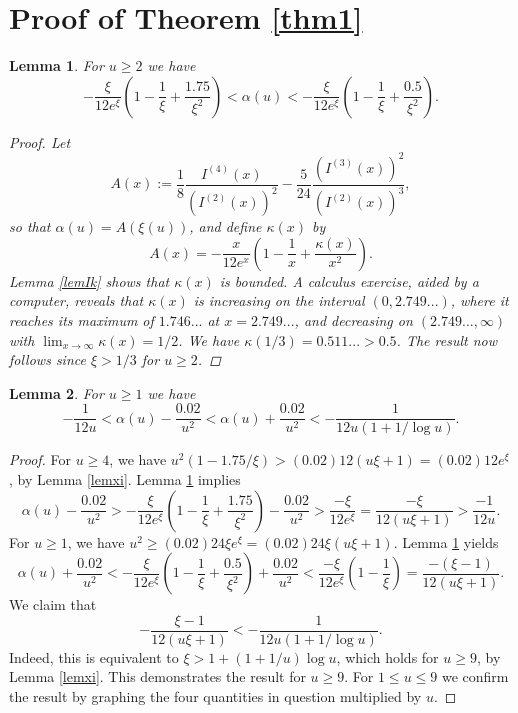 \documentclass[11pt]{amsart}
\newtheorem{lemma}{Lemma}
\begin{document}
\section{Proof of Theorem \ref{thm1}}



\begin{lemma}\label{lemAx}
For $u\ge 2$ we have 
$$
 -\frac{\xi}{12 e^\xi}\left(1-\frac{1}{\xi}+\frac{1.75}{\xi^2}\right)< \alpha(u)< -\frac{\xi}{12 e^\xi}\left(1-\frac{1}{\xi}+\frac{0.5}{\xi^2}\right) .
$$
\begin{proof}
Let
$$
A(x):=\frac{1}{8} \frac{I^{(4)}(x)}{(I^{(2)}(x))^2} - \frac{5}{24} \frac{(I^{(3)}(x))^2}{(I^{(2)}(x))^3} ,
$$
so that $\alpha(u)=A(\xi(u))$, and
define $\kappa(x)$ by 
$$
A(x) = -\frac{x}{12 e^x}\left(1-\frac{1}{x}+\frac{\kappa(x)}{x^2}\right).
$$
Lemma \ref{lemIk} shows that $\kappa(x)$ is bounded.
A calculus exercise, aided by a computer, reveals that 
$\kappa(x)$ is increasing on the interval $(0, 2.749...)$, where it reaches its maximum of $1.746...$ at $x=2.749...$, and decreasing 
on $(2.749..., \infty)$ with $\lim_{x\to \infty} \kappa(x) = 1/2$. We have $\kappa(1/3)=0.511...>0.5$. 
The result now follows since $\xi >1/3$ for $u\ge 2$. 
\end{proof}
\end{lemma}

\begin{lemma}\label{lemalpha}
For $u\ge 1$ we have 
$$
-\frac{1}{12 u}
<\alpha(u)-\frac{0.02}{u^2} < \alpha(u)+\frac{0.02}{u^2} 
< - \frac{1}{12 u (1+1/\log u)}.
$$
\end{lemma}
\begin{proof}
For $u\ge 4$, we have $u^2(1-1.75/\xi) >(0.02)  12(u\xi +1)=(0.02) 12  e^\xi$, by Lemma \ref{lemxi}. Lemma \ref{lemAx} 
implies
$$
\alpha(u) -\frac{0.02}{u^2}>  -\frac{\xi}{12 e^\xi}\left(1-\frac{1}{\xi}+\frac{1.75}{\xi^2}\right)-\frac{0.02}{u^2}
>  \frac{-\xi}{12 e^\xi}=\frac{-\xi}{12 (u\xi+1)}> \frac{-1}{12 u}.
$$
For $u\ge 1$, we have $u^2\ge (0.02) 24 \xi e^\xi= (0.02) 24 \xi(u\xi+1)$. Lemma \ref{lemAx} yields
$$
\alpha(u) +\frac{0.02}{u^2} < -\frac{\xi}{12 e^\xi}\left(1-\frac{1}{\xi}+\frac{0.5}{\xi^2}\right)+\frac{0.02}{u^2}
< \frac{-\xi}{12 e^\xi}\left(1-\frac{1}{\xi}\right)=\frac{-(\xi -1)}{12(u\xi+1)}.
$$
We claim that 
$$
-\frac{\xi -1}{12(u\xi+1)}< -\frac{1}{12u(1+1/\log u)}.
$$
Indeed, this is equivalent to $\xi>1+(1+1/u)\log u$, which holds for $u\ge 9$, by Lemma \ref{lemxi}.
This demonstrates the result for $u\ge 9$. For $1 \le u\le 9$ we confirm the result by graphing the
four quantities in question multiplied by $u$. 
\end{proof}
\end{document}
